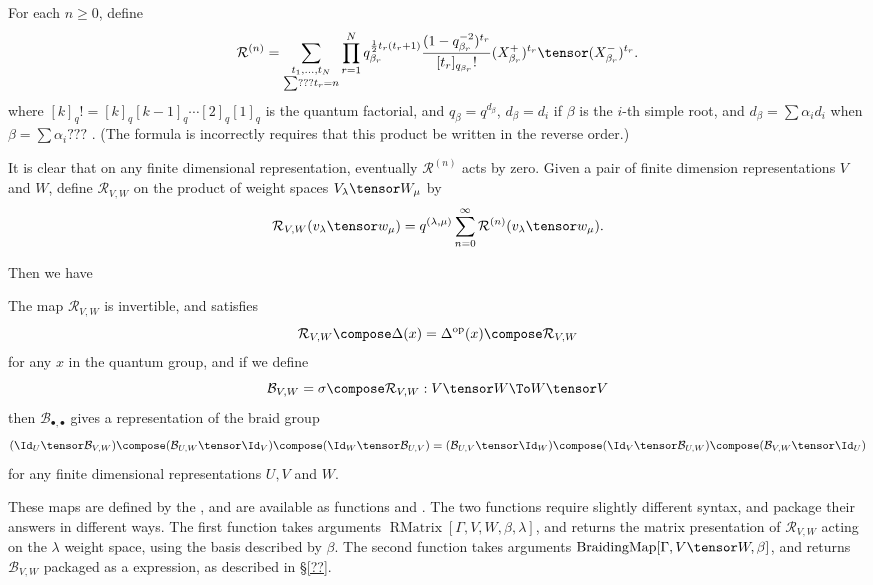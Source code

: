 For each $n\geq0$, define
\begin{equation}
\mathcal{R}^{(n)} = \sum_{\substack{t_1, \ldots, t_N \\ \sum ??? t_r = n}} \prod_{r=1}^N q_{\beta_r}^{\frac{1}{2}t_r(t_r+1)} \frac{(1-q_{\beta_r}^{-2})^{t_r}}{[t_r]_{q_{\beta_r}}!} (X_{\beta_r}^+)^{t_r} \tensor (X_{\beta_r}^-)^{t_r}.
\end{equation}
where $[k]_q! = [k]_q [k-1]_q \cdots [2]_q [1]_q$ is the quantum factorial, and $q_\beta = q^{d_\beta}$, $d_\beta = d_i$ if $\beta$ is the $i$-th simple root, and $d_\beta = \sum \alpha_i d_i$ when $\beta = \sum \alpha_i ???$ .
(The formula is \cite{CP} incorrectly requires that this product be written in the reverse order.)

It is clear that on any finite dimensional representation, eventually $\mathcal{R}^{(n)}$ acts by zero. Given a pair of finite dimension representations $V$ and $W$,
define $\mathcal{R}_{V,W}$ on the product of weight spaces $V_\lambda \tensor W_\mu$ by
\begin{equation}
\mathcal{R}_{V,W}(v_\lambda\tensor w_\mu) = q^{(\lambda,\mu)} \sum_{n=0}^\infty \mathcal{R}^{(n)}(v_\lambda \tensor w_\mu).
\end{equation}

Then we have \cite[Proposition 10.1.19]{CP}
\begin{prop}
The map $\mathcal{R}_{V,W}$ is invertible, and satisfies
\begin{equation*}
\mathcal{R}_{V,W} \compose \Delta(x) = \Delta^{\text{op}}(x) \compose \mathcal{R}_{V,W}
\end{equation*}
for any $x$ in the quantum group, and if we define $$\mathcal{B}_{V,W} = \sigma \compose \mathcal{R}_{V,W} : V \tensor W \To W \tensor V$$ then $\mathcal{B}_{\bullet,\bullet}$ gives a representation of the braid group
\begin{equation*}
(\Id_U \tensor \mathcal{B}_{V,W}) \compose (\mathcal{B}_{U,W}\tensor \Id_V) \compose (\Id_W\tensor\mathcal{B}_{U,V}) = (\mathcal{B}_{U,V}\tensor\Id_W) \compose (\Id_V\tensor\mathcal{B}_{U,W}) \compose (\mathcal{B}_{V,W}\tensor\Id_U)
\end{equation*}
for any finite dimensional representations $U, V$ and $W$.
\end{prop}

These maps are defined by the \pkg, and are available as functions  and . The two functions require slightly different syntax, and package
their answers in different ways.
The first function takes arguments
$\operatorname{RMatrix}[\Gamma, V, W, \beta, \lambda]$, and returns the matrix presentation of $\mathcal{R}_{V,W}$ acting on the $\lambda$ weight space,
using the basis described by $\beta$. The second function takes arguments $\operatorname{BraidingMap}[\Gamma, V \tensor W, \beta]$, and returns
$\mathcal{B}_{V,W}$ packaged as a  expression, as described in \S \ref{??}.

